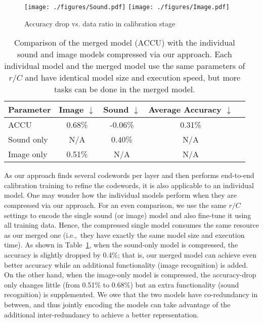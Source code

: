 \documentclass{article}
\begin{document}
	
	
	
	\begin{figure}[t]
		\centering
		\texttt{[image: ./figures/Sound.pdf]}
		\texttt{[image: ./figures/Image.pdf]}
		\caption{Accuracy drop vs. data ratio in calibration stage}	\label{fig:CalibrationDataRatio}
	\end{figure}
	
	\begin{table}[pt]
		\small
		\centering
		\caption{Comparison of the merged model (ACCU) with the individual sound and image models compressed via our approach. Each individual model and the merged model use the same parameters of $r/C$ and have identical model size and execution speed, but more tasks can be done in the merged model.}
		\label{LeNetMergeOrSingle}
		\begin{tabular}{lcccc}
			\toprule
			Parameter            & Image $\downarrow$            & Sound $\downarrow$       & Average Accuracy $\downarrow$      \\ \hline
			ACCU                &  0.68\%           & -0.06\%     & 0.31\%    \\ \hline
			Sound only           & N/A              & 0.40\%      & N/A                \\     
			Image only           & 0.51\%           & N/A         & N/A                \\
			\bottomrule
		\end{tabular}
	\end{table}
	
	
	
	
	As our approach finds several codewords per layer and then performs end-to-end calibration training to refine the codewords, it is also applicable to an individual model.
	One may wonder how the individual models perform when they are compressed via our approach.
	For an even comparison, we use the same $r/C$ settings to encode the single sound (or image) model and also fine-tune it using all training data.
	Hence, the compressed single model consumes the same resource as our merged one (i.e.,~they have exactly the same model size and execution time).
	As shown in Table~\ref{LeNetMergeOrSingle}, when the sound-only model is compressed, the accuracy is slightly dropped by 0.4\%; that is, our merged model can achieve even better accuracy while an additional functionality (image recognition) is added.
	On the other hand, when the image-only model is compressed, the accuracy-drop only changes little (from 0.51\% to 0.68\%) but an extra functionality (sound recognition) is supplemented.
	We owe that the two models have co-redundancy in between, and thus jointly encoding the models can take advantage of the additional inter-redundancy to achieve a better representation.
	
\end{document}
